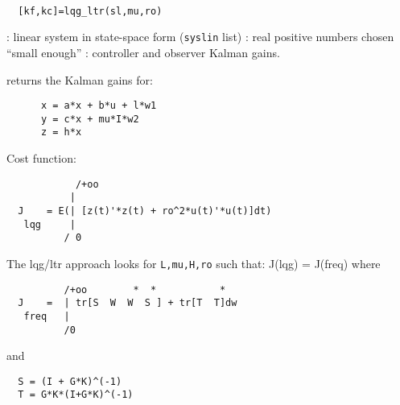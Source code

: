\begin{mandesc}
   \\ %
\end{mandesc}
\begin{calling_sequence}
\begin{verbatim}
  [kf,kc]=lqg_ltr(sl,mu,ro)  
\end{verbatim}
\end{calling_sequence}
\begin{parameters}
  \begin{varlist}
    : linear system in state-space form (\verb!syslin! list)
    :  real positive numbers chosen ``small enough''
    : controller and observer Kalman gains.
  \end{varlist}
\end{parameters}
\begin{mandescription}
  returns the Kalman gains for:
\begin{verbatim}
      x = a*x + b*u + l*w1   
      y = c*x + mu*I*w2
      z = h*x
\end{verbatim}
Cost function:
\begin{verbatim}
            /+oo
           |
  J    = E(| [z(t)'*z(t) + ro^2*u(t)'*u(t)]dt)
   lqg     |
          / 0
\end{verbatim}
The lqg/ltr approach looks for \verb!L,mu,H,ro! such that:
J(lqg) = J(freq) where
\begin{verbatim}
          /+oo        *  *           *
  J    =  | tr[S  W  W  S ] + tr[T  T]dw
   freq   |
          /0
\end{verbatim}
and
\begin{verbatim}
  S = (I + G*K)^(-1)  
  T = G*K*(I+G*K)^(-1)
\end{verbatim}
\end{mandescription}
\begin{manseealso}
\end{manseealso}
